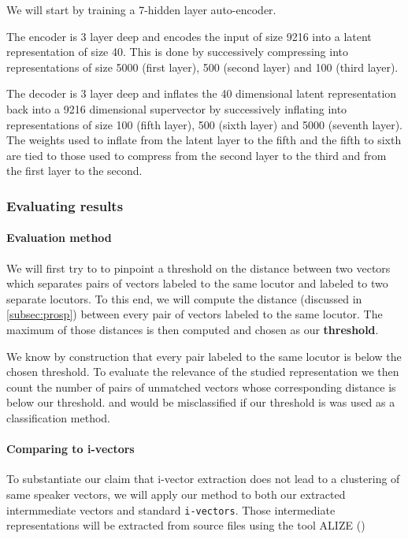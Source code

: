 \documentclass[conference]{IEEEtran}
\begin{document}
We will start by training a 7-hidden layer auto-encoder.

The encoder is 3 layer
deep and encodes the input of size 9216 into a latent representation of size 40.
This is done by successively compressing into representations of size 5000
(first layer), 500 (second layer) and 100 (third layer).

The decoder is 3 layer deep and inflates the 40 dimensional latent
representation back into a 9216 dimensional supervector by successively
inflating into representations of size 100 (fifth layer), 500 (sixth layer) and
5000 (seventh layer). The weights used to inflate from the latent layer to the
fifth and the fifth to sixth are tied to those used to compress from the second
layer to the third and from the first
layer to the second.


\subsubsection{Evaluating results}

\paragraph{Evaluation method}

We will first try to to pinpoint a threshold on the distance
between two vectors which separates pairs of vectors labeled to the same locutor
and labeled to two separate locutors. To this end, we will compute the distance
(discussed in \ref{subsec:prosp}) between every pair of vectors labeled to the
same locutor. The maximum of those distances is then computed and chosen as our
\textbf{threshold}.

We know by construction that every pair labeled to the same locutor is below the
chosen threshold. To evaluate the relevance of the studied representation we
then count the number of pairs of unmatched vectors whose corresponding distance
is below our threshold. and would be misclassified if our threshold is was used
as a classification method.

\paragraph{Comparing to i-vectors}

 To substantiate our claim that i-vector extraction does not lead to a
 clustering of same speaker vectors, we will apply our method to both our
 extracted intermmediate vectors and standard \texttt{i-vectors}. Those
 intermediate representations will be extracted from source files using the tool
 ALIZE (\cite{larcher2013alize})
\end{document}
